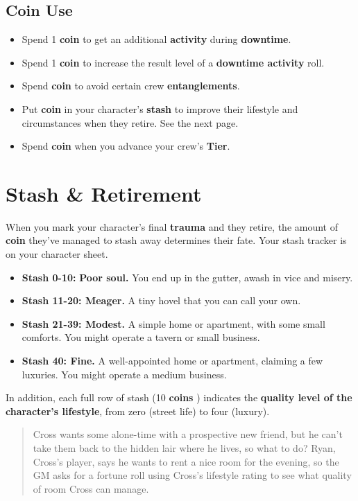 \documentclass[11pt,oneside]{book}
\newcommand{\gameterm}[1]{\textbf{#1}}
\begin{document}
\subsection{Coin Use}

\begin{itemize}
	\item Spend 1 \gameterm{coin}  to get an additional \textbf{activity} during \textbf{downtime}.
	\item Spend 1 \gameterm{coin}  to increase the result level of a \textbf{downtime activity} roll.
	\item Spend \gameterm{coin}  to avoid certain crew \textbf{entanglements}.
	\item Put \gameterm{coin}  in your character’s \textbf{stash} to improve their lifestyle and circumstances when they retire. See the next page.
	\item Spend \gameterm{coin}  when you advance your crew’s \textbf{Tier}.
\end{itemize}

\section{Stash \& Retirement}

When you mark your character’s final \gameterm{trauma}  and they retire, the amount of \gameterm{coin}  they’ve managed to stash away determines their fate. Your stash tracker is on your character sheet.

\begin{itemize}
	\item \textbf{Stash 0-10:} \textbf{Poor soul. }You end up in the gutter, awash in vice and misery.
	\item \textbf{Stash 11-20: Meager.} A tiny hovel that you can call your own.
	\item \textbf{Stash 21-39: Modest.} A simple home or apartment, with some small comforts. You might operate a tavern or small business.
	\item \textbf{Stash 40: Fine.} A well-appointed home or apartment, claiming a few luxuries. You might operate a medium business.
\end{itemize}

In addition, each full row of stash (10 \gameterm{coins} ) indicates the \textbf{quality level of the character’s lifestyle}, from zero (street life) to four (luxury).

\begin{quote}
	Cross wants some alone-time with a prospective new friend, but he can’t take them back to the hidden lair where he lives, so what to do? Ryan, Cross’s player, says he wants to rent a nice room for the evening, so the GM asks for a fortune roll using Cross’s lifestyle rating to see what quality of room Cross can manage.
\end{quote}
\end{document}
